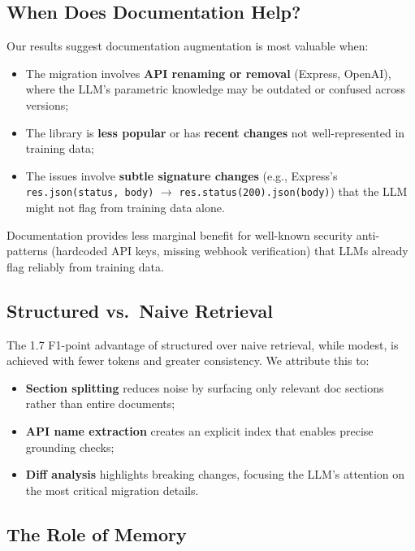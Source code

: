 \documentclass[sigconf,nonacm]{acmart}
\begin{document}
\subsection{When Does Documentation Help?}

Our results suggest documentation augmentation is most valuable when:

\begin{itemize}
    \item The migration involves \textbf{API renaming or removal} (Express, OpenAI), where the LLM's parametric knowledge may be outdated or confused across versions;
    \item The library is \textbf{less popular} or has \textbf{recent changes} not well-represented in training data;
    \item The issues involve \textbf{subtle signature changes} (e.g., Express's \texttt{res.json(status, body)} $\rightarrow$ \texttt{res.status(200).json(body)}) that the LLM might not flag from training data alone.
\end{itemize}

Documentation provides less marginal benefit for well-known security anti-patterns (hardcoded API keys, missing webhook verification) that LLMs already flag reliably from training data.

\subsection{Structured vs.\ Naive Retrieval}

The 1.7 F1-point advantage of structured over naive retrieval, while modest, is achieved with fewer tokens and greater consistency. We attribute this to:

\begin{itemize}
    \item \textbf{Section splitting} reduces noise by surfacing only relevant doc sections rather than entire documents;
    \item \textbf{API name extraction} creates an explicit index that enables precise grounding checks;
    \item \textbf{Diff analysis} highlights breaking changes, focusing the LLM's attention on the most critical migration details.
\end{itemize}

\subsection{The Role of Memory}
\end{document}
